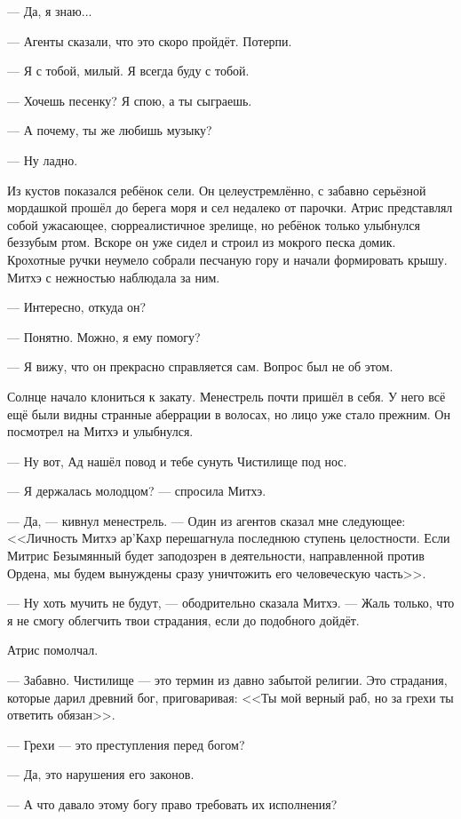 --- Да, я знаю...

--- Агенты сказали, что это скоро пройдёт.
Потерпи.

--- Я с тобой, милый.
Я всегда буду с тобой.

--- Хочешь песенку?
Я спою, а ты сыграешь.

--- А почему, ты же любишь музыку?

--- Ну ладно.

Из кустов показался ребёнок сели.
Он целеустремлённо, с забавно серьёзной мордашкой прошёл до берега моря и сел недалеко от парочки.
Атрис представлял собой ужасающее, сюрреалистичное зрелище, но ребёнок только улыбнулся беззубым ртом.
Вскоре он уже сидел и строил из мокрого песка домик.
Крохотные ручки неумело собрали песчаную гору и начали формировать крышу.
Митхэ с нежностью наблюдала за ним.

--- Интересно, откуда он?

--- Понятно.
Можно, я ему помогу?

--- Я вижу, что он прекрасно справляется сам.
Вопрос был не об этом.

Солнце начало клониться к закату.
Менестрель почти пришёл в себя.
У него всё ещё были видны странные аберрации в волосах, но лицо уже стало прежним.
Он посмотрел на Митхэ и улыбнулся.

--- Ну вот, Ад нашёл повод и тебе сунуть Чистилище под нос.

--- Я держалась молодцом? --- спросила Митхэ.

--- Да, --- кивнул менестрель.
--- Один из агентов сказал мне следующее: <<Личность Митхэ ар’Кахр перешагнула последнюю ступень целостности.
Если Митрис Безымянный будет заподозрен в деятельности, направленной против Ордена, мы будем вынуждены сразу уничтожить его человеческую часть>>.

--- Ну хоть мучить не будут, --- ободрительно сказала Митхэ.
--- Жаль только, что я не смогу облегчить твои страдания, если до подобного дойдёт.

Атрис помолчал.

--- Забавно.
Чистилище --- это термин из давно забытой религии.
Это страдания, которые дарил древний бог, приговаривая: <<Ты мой верный раб, но за грехи ты ответить обязан>>.

--- Грехи --- это преступления перед богом?

--- Да, это нарушения его законов.

--- А что давало этому богу право требовать их исполнения?

